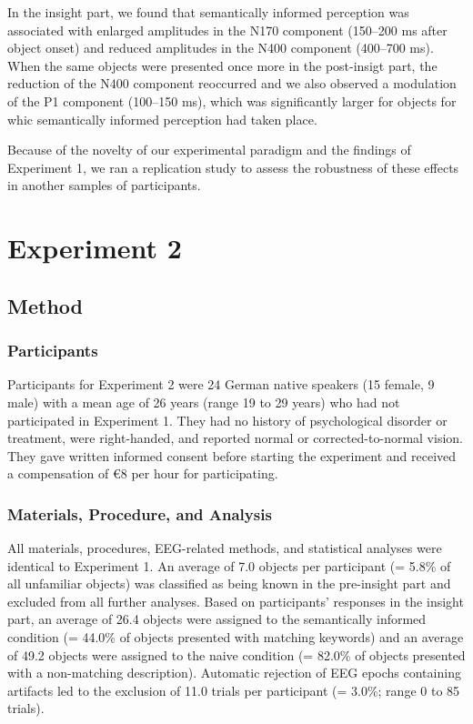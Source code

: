 \documentclass[
  english,
  doc,12pt,twoside,floatsintext]{apa7}
\begin{document}
In the insight part, we found that semantically informed perception was associated with enlarged amplitudes in the N170 component (150--200 ms after object onset) and reduced amplitudes in the N400 component (400--700 ms). When the same objects were presented once more in the post-insigt part, the reduction of the N400 component reoccurred and we also observed a modulation of the P1 component (100--150 ms), which was significantly larger for objects for whic semantically informed perception had taken place.

Because of the novelty of our experimental paradigm and the findings of Experiment 1, we ran a replication study to assess the robustness of these effects in another samples of participants.

\hypertarget{experiment-2}{%
\section{Experiment 2}\label{experiment-2}}

\hypertarget{method-1}{%
\subsection{Method}\label{method-1}}

\hypertarget{participants-1}{%
\subsubsection{Participants}\label{participants-1}}

Participants for Experiment 2 were 24 German native speakers (15 female, 9 male) with a mean age of 26 years (range 19 to 29 years) who had not participated in Experiment 1. They had no history of psychological disorder or treatment, were right-handed, and reported normal or corrected-to-normal vision. They gave written informed consent before starting the experiment and received a compensation of €8 per hour for participating.

\hypertarget{materials-procedure-and-analysis}{%
\subsubsection{Materials, Procedure, and Analysis}\label{materials-procedure-and-analysis}}

All materials, procedures, EEG-related methods, and statistical analyses were identical to Experiment 1. An average of 7.0 objects per participant (= 5.8\% of all unfamiliar objects) was classified as being known in the pre-insight part and excluded from all further analyses. Based on participants' responses in the insight part, an average of 26.4 objects were assigned to the semantically informed condition (= 44.0\% of objects presented with matching keywords) and an average of 49.2 objects were assigned to the naive condition (= 82.0\% of objects presented with a non-matching description). Automatic rejection of EEG epochs containing artifacts led to the exclusion of 11.0 trials per participant (= 3.0\%; range 0 to 85 trials).
\end{document}

